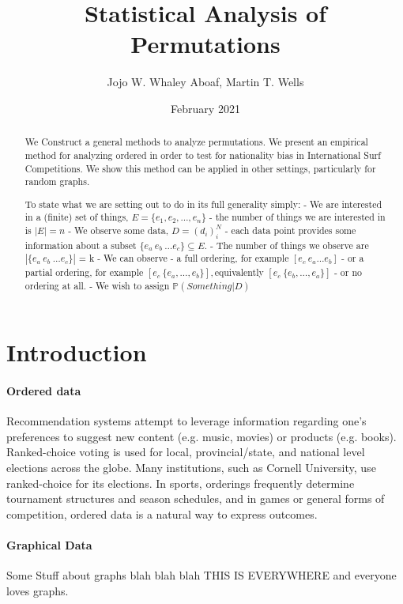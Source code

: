 \documentclass{article}
\title{Statistical Analysis of Permutations}
\author{Jojo W. Whaley Aboaf, Martin T. Wells}
\date{February 2021}
\theoremstyle{definition}
\begin{document}
\maketitle
\tableofcontents

\begin{abstract}
We Construct a general methods to analyze permutations.
We present an empirical method for analyzing ordered in order to test for nationality bias in International Surf Competitions.
We show this method can be applied in other settings, particularly for random graphs.

To state what we are setting out to do in its full generality simply:
- We are interested in a (finite) set of things, $E = \{e_1, e_2, \dots, e_n \} $
		- the number of things we are interested in is $|E| = n$
- We observe some data, $D = (d_i)_i^N$
		- each data point provides some information about a subset $ \{ e_a \: e_b \: \dots e_c \} \subseteq E$.
		- The number of things we observe are $|\{ e_a \: e_b \: \dots e_c \} |$ = k
        - We can observe
        		- a full ordering, for example $ [e_c \:  e_a \dots e_b] $
				- or a partial ordering, for example $ [e_c \: \{e_a, \dots, e_b\}], $equivalently $  [e_c \: \{e_b, \dots, e_a\}] $
                - or no ordering at all.
- We wish to assign $\mathbb{P}( Something |D)$

\end{abstract}

\section{Introduction}

\paragraph{Ordered data} Recommendation systems attempt to leverage information regarding one’s preferences to suggest new content (e.g. music, movies) or products (e.g. books). Ranked-choice voting is used for local, provincial/state, and national level elections across the globe. Many institutions, such as Cornell University, use ranked-choice for its elections. In sports, orderings frequently determine tournament structures and season schedules, and in games or general forms of competition, ordered data is a natural way to express outcomes.

\paragraph{Graphical Data} Some Stuff about graphs blah blah blah THIS IS EVERYWHERE and everyone loves graphs.
\end{document}
